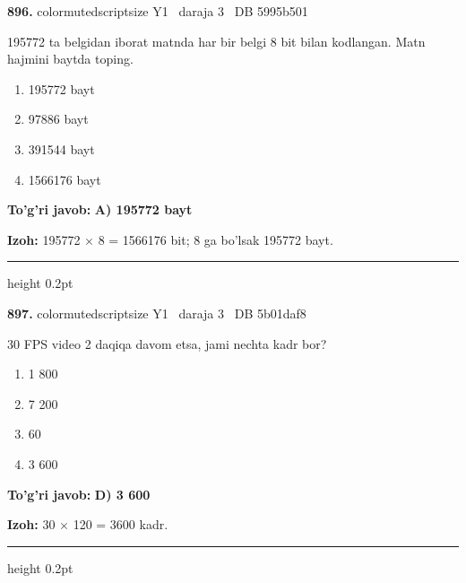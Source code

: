 \documentclass[10pt,a4paper,oneside]{article}
\begin{document}
\noindent\textbf{\color{ink}896.}  {color{muted}scriptsize Y1 \textbullet\ daraja 3 \textbullet\ DB 5995b501}
\par
195772 ta belgidan iborat matnda har bir belgi 8 bit bilan kodlangan. Matn hajmini baytda toping.
\begin{enumerate}[label=\Alph*),leftmargin=9mm]
\item 195772 bayt
\item 97886 bayt
\item 391544 bayt
\item 1566176 bayt
\end{enumerate}
\begin{tcolorbox}[enhanced,breakable,colback=teal!4,colframe=teal!50!black,boxrule=0.5pt,arc=1.1mm,left=3mm,right=3mm,top=1.7mm,bottom=1.7mm,before skip=2mm,after skip=2mm]
\textbf{\color{teal}To'g'ri javob:} \textbf{A) 195772 bayt}
\par\smallskip
\textbf{Izoh:} 195772 \ensuremath{\times} 8 = 1566176 bit; 8 ga bo'lsak 195772 bayt.
\end{tcolorbox}
\vspace{2mm}\hrule height 0.2pt \vspace{3mm}

\noindent\textbf{\color{ink}897.}  {color{muted}scriptsize Y1 \textbullet\ daraja 3 \textbullet\ DB 5b01daf8}
\par
30 FPS video 2 daqiqa davom etsa, jami nechta kadr bor?
\begin{enumerate}[label=\Alph*),leftmargin=9mm]
\item 1 800
\item 7 200
\item 60
\item 3 600
\end{enumerate}
\begin{tcolorbox}[enhanced,breakable,colback=teal!4,colframe=teal!50!black,boxrule=0.5pt,arc=1.1mm,left=3mm,right=3mm,top=1.7mm,bottom=1.7mm,before skip=2mm,after skip=2mm]
\textbf{\color{teal}To'g'ri javob:} \textbf{D) 3 600}
\par\smallskip
\textbf{Izoh:} 30 \ensuremath{\times} 120 = 3600 kadr.
\end{tcolorbox}
\vspace{2mm}\hrule height 0.2pt \vspace{3mm}
\end{document}
